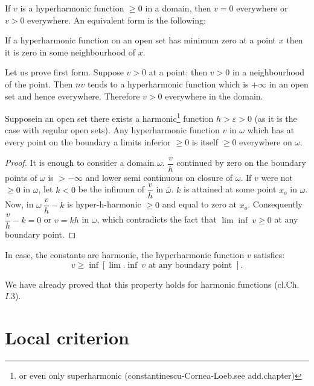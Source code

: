 \begin{thm}[i]\label{p4:chap2:sec8:thm3-i} %
  If $v$ is a hyperharmonic function $\ge 0$ in a domain, then $v = 0$
  everywhere or $v > 0$ everywhere. An equivalent form is the
  following: 

  If a hyperharmonic function on an open set has  minimum zero at a
  point $x$ then it is zero in some neighbourhood of $x$. 
  
  Let us prove first form. Suppose $v > 0$ at a point: then $v > 0$ in a
  neighbourhood of the point. Then $nv$ tends to a hyperharmonic
  function which is $+ \infty$ in an open set and hence
  everywhere. Therefore $v > 0$ everywhere in the domain. 
\end{thm}

\setcounter{thm}{2}
\begin{thm}[ii]\label{p4:chap2:sec8:thm3-ii} %
  Suppose\pageoriginale in an open set there exists a harmonic\footnote{or even
    only superharmonic (constantinescu-Cornea-Loeb.see add.chapter)}
  function $h > \varepsilon > 0$ (as it is the case with regular open
  sets). Any hyperharmonic function $v$ in $\omega$ which has at every
  point on the boundary a limits inferior $\ge 0$ is itself $\ge 0$
  everywhere on $\omega$. 
\end{thm}

\begin{proof}
  It is enough to consider a domain $\omega$. $\dfrac{v}{h}$ continued
  by zero on the boundary points of $\omega$ is $> - \infty$ and lower
  semi continuous on closure of $\omega$. If $v$ were not $\ge 0$ in
  $\omega$, let $k < 0$ be the infimum of  $\dfrac{v}{h}$ in
  $\bar{\omega}$.  $k$ is attained at some point $x_o$ in
  $\omega$. Now, in $\omega ~ \dfrac{v}{h} - k$ is hyper-h-harmonic
  $\ge 0$ and equal to zero at $x_o$. Consequently $\dfrac{v}{h} - k =
  0$ or $ v = kh $ in $\omega$, which contradicts the fact that $\lim
  \inf ~ v \ge 0$ at any boundary point. 
\end{proof}

In case, the constants are harmonic, the hyperharmonic function $v$ satisfies:
$$
v \ge \inf [ \lim.\inf ~ v \text{ at any boundary point }].
$$

We have already proved that this property holds for harmonic functions
(cl.Ch.$I.3$). 

\section{Local criterion}\label{p4:chap2:sec9}%

